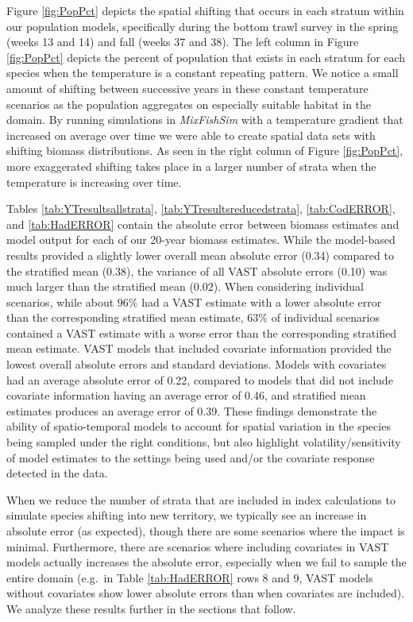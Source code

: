 \documentclass[
  12pt,
]{article}
\begin{document}
Figure \ref{fig:PopPct} depicts the spatial shifting that occurs in each stratum within our population models, specifically during the bottom trawl survey in the spring (weeks 13 and 14) and fall (weeks 37 and 38). The left column in Figure \ref{fig:PopPct} depicts the percent of population that exists in each stratum for each species when the temperature is a constant repeating pattern. We notice a small amount of shifting between successive years in these constant temperature scenarios as the population aggregates on especially suitable habitat in the domain. By running simulations in \emph{MixFishSim} with a temperature gradient that increased on average over time we were able to create spatial data sets with shifting biomass distributions. As seen in the right column of Figure \ref{fig:PopPct}, more exaggerated shifting takes place in a larger number of strata when the temperature is increasing over time.

Tables \ref{tab:YTresultsallstrata}, \ref{tab:YTresultsreducedstrata}, \ref{tab:CodERROR}, and \ref{tab:HadERROR} contain the absolute error between biomass estimates and model output for each of our 20-year biomass estimates. While the model-based results provided a slightly lower overall mean absolute error (0.34) compared to the stratified mean (0.38), the variance of all VAST absolute errors (0.10) was much larger than the stratified mean (0.02). When considering individual scenarios, while about \(96\%\) had a VAST estimate with a lower absolute error than the corresponding stratified mean estimate, \(63\%\) of individual scenarios contained a VAST estimate with a worse error than the corresponding stratified mean estimate. VAST models that included covariate information provided the lowest overall absolute errors and standard deviations. Models with covariates had an average absolute error of 0.22, compared to models that did not include covariate information having an average error of 0.46, and stratified mean estimates produces an average error of 0.39. These findings demonstrate the ability of spatio-temporal models to account for spatial variation in the species being sampled under the right conditions, but also highlight volatility/sensitivity of model estimates to the settings being used and/or the covariate response detected in the data.

When we reduce the number of strata that are included in index calculations to simulate species shifting into new territory, we typically see an increase in absolute error (as expected), though there are some scenarios where the impact is minimal. Furthermore, there are scenarios where including covariates in VAST models actually increases the absolute error, especially when we fail to sample the entire domain (e.g.~in Table \ref{tab:HadERROR} rows 8 and 9, VAST models without covariates show lower absolute errors than when covariates are included). We analyze these results further in the sections that follow.
\end{document}
